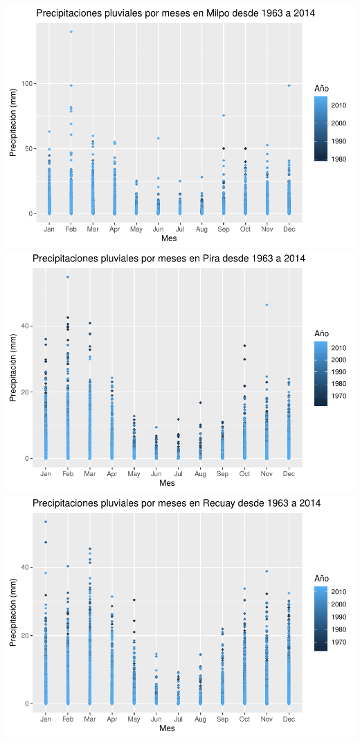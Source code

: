 \documentclass[]{article}
\begin{document}
\includegraphics{proyecto_files/figure-latex/unnamed-chunk-5-1.pdf}
\includegraphics{proyecto_files/figure-latex/unnamed-chunk-5-2.pdf}
\includegraphics{proyecto_files/figure-latex/unnamed-chunk-5-3.pdf}
\end{document}
